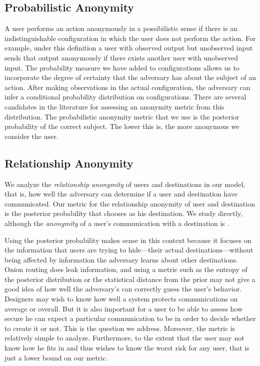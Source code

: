 \documentclass[prodmode,acmtissec]{acmsmall}
\begin{document}
\subsection{Probabilistic Anonymity}
A user performs an action anonymously in a possibilistic sense if there is an indistinguishable configuration in which the user does not perform the action.  For example, under this definition a user with observed output but unobserved input sends that output anonymously if there exists another user with unobserved input.  The probability measure we have added to configurations allows us to incorporate the degree of certainty that the adversary has about the subject of an action.  After making observations in the actual configuration, the adversary can infer a conditional probability distribution on configurations.  There are several candidates in the literature for assessing an anonymity metric from this distribution.  The probabilistic anonymity metric that we use is the posterior probability of the correct subject.  The lower this is, the more anonymous we consider the user.

\subsection{Relationship Anonymity}
We analyze the \emph{relationship anonymity} of users and destinations in our model, that is, how well the adversary can determine if a user and destination have communicated.  Our metric for the relationship anonymi\-ty of user  and destination  is the posterior probability  that  chooses  as his destination.  We study  directly, although the \emph{anonymity} of a user's communication with a destination is .

Using the posterior probability makes sense in this context because it
focuses on the information that users are trying to hide---their
actual destinations---without being affected by information the
adversary learns about other destinations.  Onion routing does leak
information, and using a metric such as the entropy of the posterior
distribution or the statistical distance from the prior may not give a
good idea of how well the adversary's can correctly guess the user's
behavior.  Designers may wish to know how well a system protects
communications on average or overall. But it is also important for a
user to be able to assess how secure he can expect a particular
communication to be in order to decide whether to create it or
not. This is the question we address. Moreover, the metric is
relatively simple to analyze. Furthermore, to the extent that the user
may not know how he fits in and thus wishes to know the worst risk for
any user, that is just a lower bound on our metric.
\end{document}
